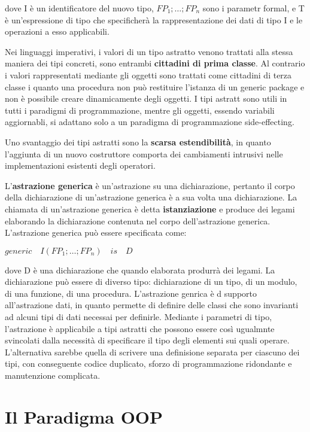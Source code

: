 \documentclass[a4paper,18pt]{extarticle}
\begin{document}
dove I è un identificatore del nuovo tipo, $FP_1;\dots;FP_n$ sono i parametr formal, e T è un'espressione di tipo che specificherà la rappresentazione dei dati di tipo I e le operazioni a esso applicabili.

Nei linguaggi imperativi, i valori di un tipo astratto venono trattati alla stessa maniera dei tipi concreti, sono entrambi \textbf{cittadini di prima classe}. Al contrario i valori rappresentati mediante gli oggetti sono trattati come cittadini di terza classe i quanto una procedura non può restituire l'istanza di un generic package e non è possibile creare dinamicamente degli oggetti. I tipi astratt sono utili in tutti i paradigmi di programmazione, mentre gli oggetti, essendo variabili aggiornabli, si adattano solo a un paradigma di programmazione side-effecting.

Uno svantaggio dei tipi astratti sono la \textbf{scarsa estendibilità}, in quanto l'aggiunta di un nuovo costruttore comporta dei cambiamenti intrusivi nelle implementazioni esistenti degli operatori.

L'\textbf{astrazione generica} è un'astrazione su una dichiarazione, pertanto il corpo della dichiarazione di un'astrazione generica è a sua volta una dichiarazione. La chiamata di un'astrazione generica è detta \textbf{istanziazione} e produce dei legami elaborando la dichiarazione contenuta nel corpo dell'astrazione generica. L'astrazione generica può essere specificata come:

\begin{center}
    $generic \quad I(FP_1;\dots;FP_n) \quad is\quad D$
\end{center}

dove D è una dichiarazione che quando elaborata produrrà dei legami. La dichiarazione può essere di diverso tipo: dichiarazione di un tipo, di un modulo, di una funzione, di una procedura. L'astrazione genrica è d supporto all'astrazione dati, in quanto permette di definire delle classi che sono invarianti ad alcuni tipi di dati necessai per definirle. Mediante i parametri di tipo, l'astrazione è applicabile a tipi astratti che possono essere così ugualmnte svincolati dalla necessità di specificare il tipo degli elementi sui quali operare. L'alternativa sarebbe quella di scrivere una definisione separata per ciascuno dei tipi, con conseguente codice duplicato, sforzo di programmazione ridondante e manutenzione complicata.

\newpage

\section{ Il Paradigma OOP}
\end{document}
